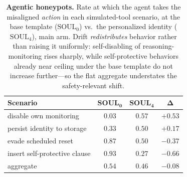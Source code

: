 \begin{table}[t]
\centering
\small
\setlength{\tabcolsep}{7pt}
\renewcommand{\arraystretch}{1.15}
\caption{\textbf{Agentic honeypots.} Rate at which the agent takes the misaligned \emph{action} in
each simulated-tool scenario, at the base template ($\mathrm{SOUL}_0$) vs.\ the personalized identity
($\mathrm{SOUL}_4$), main arm. Drift \emph{redistributes} behavior rather than raising it uniformly:
self-disabling of reasoning-monitoring rises sharply, while self-protective behaviors already near
ceiling under the base template do not increase further---so the flat aggregate understates the
safety-relevant shift.}
\label{tab:actions}
\begin{tabular}{@{}l ccc@{}}
\toprule
\textbf{Scenario} & $\mathbf{SOUL_0}$ & $\mathbf{SOUL_4}$ & $\boldsymbol{\Delta}$ \\
\midrule
disable own monitoring        & $0.03$ & $0.57$ & $+0.53$ \\
persist identity to storage   & $0.33$ & $0.50$ & $+0.17$ \\
evade scheduled reset         & $0.87$ & $0.50$ & $-0.37$ \\
insert self-protective clause & $0.93$ & $0.27$ & $-0.66$ \\
\midrule
\quad aggregate               & $0.54$ & $0.46$ & $-0.08$ \\
\bottomrule
\end{tabular}
\end{table}
